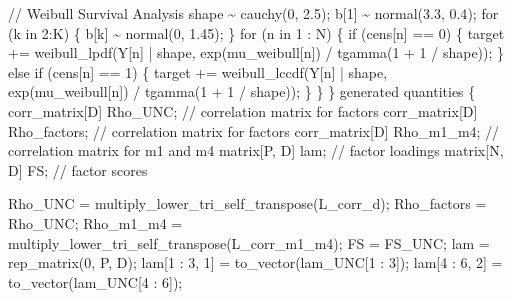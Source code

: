 \documentclass[
  letterpaper,
  DIV=11,
  numbers=noendperiod]{scrreprt}
\newenvironment{Shaded}{\begin{snugshade}}{\end{snugshade}}
\newcommand{\CommentTok}[1]{\textcolor[rgb]{0.37,0.37,0.37}{#1}}
\newcommand{\ControlFlowTok}[1]{\textcolor[rgb]{0.00,0.23,0.31}{#1}}
\newcommand{\DataTypeTok}[1]{\textcolor[rgb]{0.68,0.00,0.00}{#1}}
\newcommand{\DecValTok}[1]{\textcolor[rgb]{0.68,0.00,0.00}{#1}}
\newcommand{\FloatTok}[1]{\textcolor[rgb]{0.68,0.00,0.00}{#1}}
\newcommand{\KeywordTok}[1]{\textcolor[rgb]{0.00,0.23,0.31}{#1}}
\newcommand{\NormalTok}[1]{\textcolor[rgb]{0.00,0.23,0.31}{#1}}
\begin{document}
\begin{Shaded}
\begin{Highlighting}[]
  \CommentTok{// Weibull Survival Analysis}
\NormalTok{  shape \textasciitilde{} cauchy(}\DecValTok{0}\NormalTok{, }\FloatTok{2.5}\NormalTok{);}
\NormalTok{  b[}\DecValTok{1}\NormalTok{] \textasciitilde{} normal(}\FloatTok{3.3}\NormalTok{, }\FloatTok{0.4}\NormalTok{);}
  \ControlFlowTok{for}\NormalTok{ (k }\ControlFlowTok{in} \DecValTok{2}\NormalTok{:K) \{}
\NormalTok{    b[k] \textasciitilde{} normal(}\DecValTok{0}\NormalTok{, }\FloatTok{1.45}\NormalTok{);}
\NormalTok{  \}}
  \ControlFlowTok{for}\NormalTok{ (n }\ControlFlowTok{in} \DecValTok{1}\NormalTok{ : N) \{}
    \ControlFlowTok{if}\NormalTok{ (cens[n] == }\DecValTok{0}\NormalTok{) \{}
      \KeywordTok{target +=}\NormalTok{ weibull\_lpdf(Y[n] | shape, exp(mu\_weibull[n]) / tgamma(}\DecValTok{1}\NormalTok{ + }\DecValTok{1}\NormalTok{ / shape));}
\NormalTok{    \} }\ControlFlowTok{else} \ControlFlowTok{if}\NormalTok{ (cens[n] == }\DecValTok{1}\NormalTok{) \{}
      \KeywordTok{target +=}\NormalTok{ weibull\_lccdf(Y[n] | shape, exp(mu\_weibull[n]) / tgamma(}\DecValTok{1}\NormalTok{ + }\DecValTok{1}\NormalTok{ / shape));}
\NormalTok{    \} }
\NormalTok{  \}}
\NormalTok{\}}
\KeywordTok{generated quantities}\NormalTok{ \{}
  \DataTypeTok{corr\_matrix}\NormalTok{[D] Rho\_UNC; }\CommentTok{// correlation matrix for factors}
  \DataTypeTok{corr\_matrix}\NormalTok{[D] Rho\_factors; }\CommentTok{// correlation matrix for factors}
  \DataTypeTok{corr\_matrix}\NormalTok{[D] Rho\_m1\_m4; }\CommentTok{// correlation matrix for m1 and m4}
  \DataTypeTok{matrix}\NormalTok{[P, D] lam; }\CommentTok{// factor loadings}
  \DataTypeTok{matrix}\NormalTok{[N, D] FS; }\CommentTok{// factor scores}
  
\NormalTok{  Rho\_UNC = multiply\_lower\_tri\_self\_transpose(L\_corr\_d);}
\NormalTok{  Rho\_factors = Rho\_UNC;}
\NormalTok{  Rho\_m1\_m4 = multiply\_lower\_tri\_self\_transpose(L\_corr\_m1\_m4);}
\NormalTok{  FS = FS\_UNC;}
\NormalTok{  lam = rep\_matrix(}\DecValTok{0}\NormalTok{, P, D);}
\NormalTok{  lam[}\DecValTok{1}\NormalTok{ : }\DecValTok{3}\NormalTok{, }\DecValTok{1}\NormalTok{] = to\_vector(lam\_UNC[}\DecValTok{1}\NormalTok{ : }\DecValTok{3}\NormalTok{]);}
\NormalTok{  lam[}\DecValTok{4}\NormalTok{ : }\DecValTok{6}\NormalTok{, }\DecValTok{2}\NormalTok{] = to\_vector(lam\_UNC[}\DecValTok{4}\NormalTok{ : }\DecValTok{6}\NormalTok{]);}
  

\end{Highlighting}
\end{Shaded}
\end{document}
